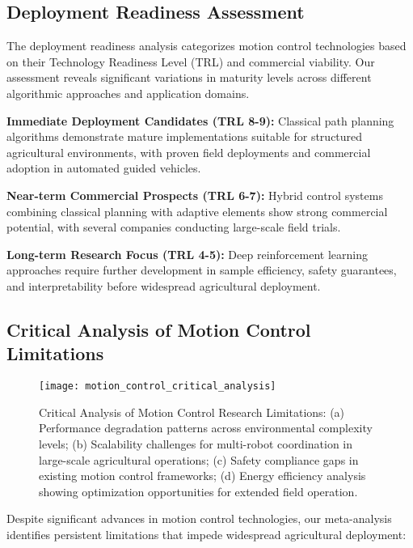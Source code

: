 \subsection{Deployment Readiness Assessment}
\label{subsec:motion_deployment_readiness}



The deployment readiness analysis categorizes motion control technologies based on their Technology Readiness Level (TRL) and commercial viability. Our assessment reveals significant variations in maturity levels across different algorithmic approaches and application domains.

\textbf{Immediate Deployment Candidates (TRL 8-9):}
Classical path planning algorithms demonstrate mature implementations suitable for structured agricultural environments, with proven field deployments and commercial adoption in automated guided vehicles.

\textbf{Near-term Commercial Prospects (TRL 6-7):}
Hybrid control systems combining classical planning with adaptive elements show strong commercial potential, with several companies conducting large-scale field trials.

\textbf{Long-term Research Focus (TRL 4-5):}
Deep reinforcement learning approaches require further development in sample efficiency, safety guarantees, and interpretability before widespread agricultural deployment.

\subsection{Critical Analysis of Motion Control Limitations}
\label{subsec:motion_critical_analysis}

\begin{figure}[!htbp]
    \centering
    \texttt{[image: motion\_control\_critical\_analysis]}
    \caption{Critical Analysis of Motion Control Research Limitations: (a) Performance degradation patterns across environmental complexity levels; (b) Scalability challenges for multi-robot coordination in large-scale agricultural operations; (c) Safety compliance gaps in existing motion control frameworks; (d) Energy efficiency analysis showing optimization opportunities for extended field operation.}
    \label{fig:motion_control_critical}
\end{figure}

Despite significant advances in motion control technologies, our meta-analysis identifies persistent limitations that impede widespread agricultural deployment:

